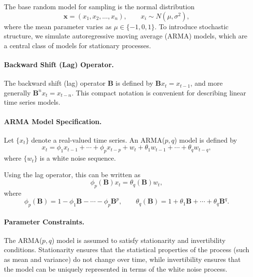 \documentclass[12pt,a4paper]{article}
\begin{document}
The base random model for sampling is the normal distribution 
\[
\mathbf{x}=(x_1,x_2,\dots,x_n), \qquad x_i \sim N(\mu, \sigma^2),
\]
where the mean parameter varies as $\mu \in \{-1, 0, 1\}$.
To introduce stochastic structure, we simulate autoregressive moving average ($\mathrm{ARMA}$) models, which are a central class of models for stationary processes.

\paragraph{Backward Shift (Lag) Operator.}
The backward shift (lag) operator $\mathbf{B}$ is defined by $\mathbf{B}x_t = x_{t-1}$, and more generally $\mathbf{B}^n x_t = x_{t-n}$.  
This compact notation is convenient for describing linear time series models.

\paragraph{ARMA Model Specification.}
Let $\{x_t\}$ denote a real-valued time series.  
An ARMA($p,q$) model is defined by
\begin{equation}
	x_t = \phi_1 x_{t-1} + \cdots + \phi_p x_{t-p} 
	+ w_t + \theta_1 w_{t-1} + \cdots + \theta_q w_{t-q},
	\label{eq:arma}
\end{equation}
where $\{w_t\}$ is a white noise sequence.  

Using the lag operator, this can be written as
\begin{equation}
	\phi_p(\mathbf{B}) x_t = \theta_q(\mathbf{B}) w_t,
	\label{eq:arma_polynomial}
\end{equation}
where
\[
\phi_p(\mathbf{B}) = 1 - \phi_1 \mathbf{B} - \cdots - \phi_p \mathbf{B}^p, 
\qquad
\theta_q(\mathbf{B}) = 1 + \theta_1 \mathbf{B} + \cdots + \theta_q \mathbf{B}^q.
\]

\paragraph{Parameter Constraints.}
The ARMA($p,q$) model is assumed to satisfy stationarity and invertibility conditions. 
Stationarity ensures that the statistical properties of the process (such as mean and variance) do not change over time, 
while invertibility ensures that the model can be uniquely represented in terms of the white noise process.
\end{document}
